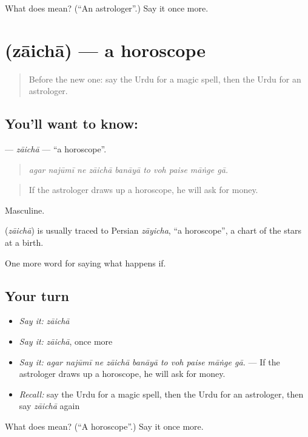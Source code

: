 \begin{tcolorbox}[breakable,colback=teal!4,colframe=teal!35!black,title={Before you move on}]
What does  mean? (\textquotedblleft{}An astrologer\textquotedblright{}.) Say it once more.
\end{tcolorbox}
\section[\texorpdfstring{\ur{زائچہ} (zāichā)}{زائچہ (zāichā)}]{ (zāichā) — a horoscope}

\label{lesson:UR-C535-zaicha}



\begin{quote}
Before the new one: say the Urdu for a magic spell, then the Urdu for an astrologer.
\end{quote}

\subsection*{You'll want to know: }
\textbf{} — \emph{zāichā} — \textquotedblleft{}a horoscope\textquotedblright{}.

\begin{quote}
         
\end{quote}

\begin{quote}
\emph{agar najūmī ne zāichā banāyā to voh paise māṅge gā.}
\end{quote}

\begin{quote}
If the astrologer draws up a horoscope, he will ask for money.
\end{quote}

Masculine.

\begin{cousinweb}
\textbf{} (\emph{zāichā}) is usually traced to Persian \emph{zāyicha}, \textquotedblleft{}a horoscope\textquotedblright{}, a chart of the stars at a birth.
\end{cousinweb}

\begin{grammarlens}[title={What you've built}]
One more word for saying what happens if.
\end{grammarlens}

\subsection*{Your turn}
\begin{itemize}
\raggedright
  \item \emph{Say it:} \emph{zāichā}
  \item \emph{Say it:} \emph{zāichā}, once more
  \item \emph{Say it:} \emph{agar najūmī ne zāichā banāyā to voh paise māṅge gā.} — If the astrologer draws up a horoscope, he will ask for money.
  \item \emph{Recall:} say the Urdu for a magic spell, then the Urdu for an astrologer, then say \emph{zāichā} again
\end{itemize}

\begin{tcolorbox}[breakable,colback=teal!4,colframe=teal!35!black,title={Before you move on}]
What does  mean? (\textquotedblleft{}A horoscope\textquotedblright{}.) Say it once more.
\end{tcolorbox}

